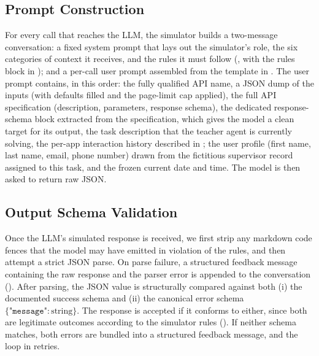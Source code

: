 \subsection{Prompt Construction}
For every call that reaches the LLM, the simulator builds a two-message conversation: a fixed system prompt that lays out the simulator's role, the six categories of context it receives, and the rules it must follow (, with the rules block in
); and a per-call user prompt assembled from the template in . The user prompt contains, in this order: the fully qualified API name, a JSON dump of the inputs (with defaults filled and the page-limit
cap applied), the full API specification (description, parameters, response schema), the dedicated response-schema block extracted from the specification, which gives the model a clean target for its output, the task description that the teacher agent is currently solving, the per-app interaction history described in ; the user profile (first name, last name, email, phone number) drawn from the fictitious supervisor record assigned to this task, and the frozen current date and time. The model is then asked to return raw JSON.

\subsection{Output Schema Validation}
\label{app:sim_schema_check}
Once the LLM's simulated response is received, we first strip any markdown code fences that the model may have emitted in violation of the rules, and then attempt a strict JSON parse. On parse failure, a structured feedback message containing the raw response and the parser error is appended to the conversation (). After parsing, the JSON value is structurally compared against both (i) the documented success schema and (ii) the canonical error schema $\{\texttt{"message"}: \text{string}\}$. The response is accepted if it conforms to either, since both are legitimate outcomes according to the simulator rules (). If neither schema matches, both errors are bundled into a structured feedback message, and the loop in  retries.


